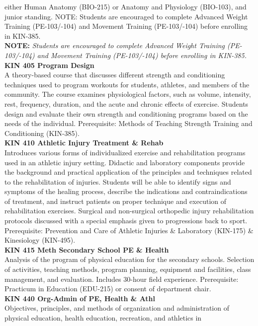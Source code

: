 \documentclass[
  letterpaper,
]{scrbook}
\begin{document}
either Human Anatomy (BIO-215) or Anatomy and Physiology (BIO-103), and
junior standing. NOTE: Students are encouraged to complete Advanced
Weight Training (PE-103/-104) and Movement Training (PE-103/-104) before
enrolling in KIN-385.\\
\textbf{NOTE:} \emph{Students are encouraged to complete Advanced Weight
Training (PE-103/-104) and Movement Training (PE-103/-104) before
enrolling in KIN-385.}\\
\textbf{KIN 405 Program Design}\\
A theory-based course that discusses different strength and conditioning
techniques used to program workouts for students, athletes, and members
of the community. The course examines physiological factors, such as
volume, intensity, rest, frequency, duration, and the acute and chronic
effects of exercise. Students design and evaluate their own strength and
conditioning programs based on the needs of the individual.
Prerequisite: Methods of Teaching Strength Training and Conditioning
(KIN-385).\\
\textbf{KIN 410 Athletic Injury Treatment \& Rehab}\\
Introduces various forms of individualized exercise and rehabilitation
programs used in an athletic injury setting. Didactic and laboratory
components provide the background and practical application of the
principles and techniques related to the rehabilitation of injuries.
Students will be able to identify signs and symptoms of the healing
process, describe the indications and contraindications of treatment,
and instruct patients on proper technique and execution of
rehabilitation exercises. Surgical and non-surgical orthopedic injury
rehabilitation protocols discussed with a special emphasis given to
progressions back to sport. Prerequisite: Prevention and Care of
Athletic Injuries \& Laboratory (KIN-175) \& Kinesiology (KIN-495).\\
\textbf{KIN 415 Meth Secondary School PE \& Health}\\
Analysis of the program of physical education for the secondary schools.
Selection of activities, teaching methods, program planning, equipment
and facilities, class management, and evaluation. Includes 30-hour field
experience. Prerequisite: Practicum in Education (EDU-215) or consent of
department chair.\\
\textbf{KIN 440 Org-Admin of PE, Health \& Athl}\\
Objectives, principles, and methods of organization and administration
of physical education, health education, recreation, and athletics in
\end{document}
